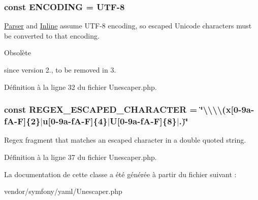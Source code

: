 \subsubsection[{\texorpdfstring{E\+N\+C\+O\+D\+I\+NG}{ENCODING}}]{\setlength{\rightskip}{0pt plus 5cm}const E\+N\+C\+O\+D\+I\+NG = \textquotesingle{}U\+TF-\/8\textquotesingle{}}\hypertarget{class_symfony_1_1_component_1_1_yaml_1_1_unescaper_ac469db39bd848179bdd0d025f92fece3}{}\label{class_symfony_1_1_component_1_1_yaml_1_1_unescaper_ac469db39bd848179bdd0d025f92fece3}
\hyperlink{class_symfony_1_1_component_1_1_yaml_1_1_parser}{Parser} and \hyperlink{class_symfony_1_1_component_1_1_yaml_1_1_inline}{Inline} assume U\+T\+F-\/8 encoding, so escaped Unicode characters must be converted to that encoding.

\begin{DoxyRefDesc}{Obsolète}
\item[\hyperlink{deprecated__deprecated000001}{Obsolète}]since version 2., to be removed in 3.\end{DoxyRefDesc}


Définition à la ligne 32 du fichier Unescaper.\+php.

\subsubsection[{\texorpdfstring{R\+E\+G\+E\+X\+\_\+\+E\+S\+C\+A\+P\+E\+D\+\_\+\+C\+H\+A\+R\+A\+C\+T\+ER}{REGEX_ESCAPED_CHARACTER}}]{\setlength{\rightskip}{0pt plus 5cm}const R\+E\+G\+E\+X\+\_\+\+E\+S\+C\+A\+P\+E\+D\+\_\+\+C\+H\+A\+R\+A\+C\+T\+ER = \char`\"{}\textbackslash{}\textbackslash{}\textbackslash{}\textbackslash{}(x\mbox{[}0-\/9a-\/f\+A-\/\+F\mbox{]}\{2\}$\vert$u\mbox{[}0-\/9a-\/f\+A-\/\+F\mbox{]}\{4\}$\vert$\+U\mbox{[}0-\/9a-\/f\+A-\/\+F\mbox{]}\{8\}$\vert$.)\char`\"{}}\hypertarget{class_symfony_1_1_component_1_1_yaml_1_1_unescaper_a5356e3ed7b9c99d134587dc04ca30e45}{}\label{class_symfony_1_1_component_1_1_yaml_1_1_unescaper_a5356e3ed7b9c99d134587dc04ca30e45}
Regex fragment that matches an escaped character in a double quoted string. 

Définition à la ligne 37 du fichier Unescaper.\+php.



La documentation de cette classe a été générée à partir du fichier suivant \+:\begin{DoxyCompactItemize}
\item 
vendor/symfony/yaml/Unescaper.\+php\end{DoxyCompactItemize}
